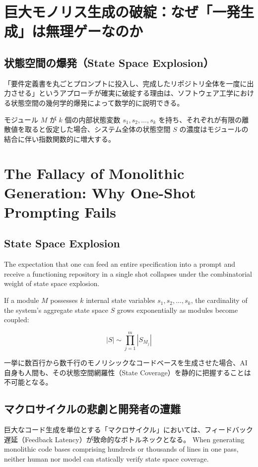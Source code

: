 \documentclass[11pt,a4paper,openany]{book}
\newif\ifja
\begin{document}
  \chapter{巨大モノリス生成の破綻：なぜ「一発生成」は無理ゲーなのか}
  \section{状態空間の爆発（State Space Explosion）}
  「要件定義書を丸ごとプロンプトに投入し、完成したリポジトリ全体を一度に出力させる」というアプローチが確実に破綻する理由は、ソフトウェア工学における状態空間の幾何学的爆発によって数学的に説明できる。

  モジュール $M$ が $k$ 個の内部状態変数 $s_1, s_2, \dots, s_k$ を持ち、それぞれが有限の離散値を取ると仮定した場合、システム全体の状態空間 $S$ の濃度はモジュールの結合に伴い指数関数的に増大する。
\else
  \chapter{The Fallacy of Monolithic Generation: Why One-Shot Prompting Fails}
  \section{State Space Explosion}
  The expectation that one can feed an entire specification into a prompt and receive a functioning repository in a single shot collapses under the combinatorial weight of state space explosion.

  If a module $M$ possesses $k$ internal state variables $s_1, s_2, \dots, s_k$, the cardinality of the system's aggregate state space $S$ grows exponentially as modules become coupled:
\fi

\begin{equation}
|S| \sim \prod_{j=1}^m |S_{M_j}|
\end{equation}

\ifja
  一挙に数百行から数千行のモノリシックなコードベースを生成させた場合、AI自身も人間も、その状態空間網羅性（State Coverage）を静的に把握することは不可能となる。

  \section{マクロサイクルの悲劇と開発者の遭難}
  巨大なコード生成を単位とする「マクロサイクル」においては、フィードバック遅延（Feedback Latency）が致命的なボトルネックとなる。
\else
  When generating monolithic code bases comprising hundreds or thousands of lines in one pass, neither human nor model can statically verify state space coverage.
\end{document}
